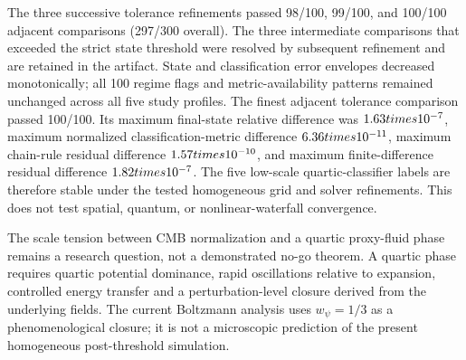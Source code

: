 \documentclass[epj]{svjour}
\begin{document}
The three successive tolerance refinements passed 98/100, 99/100,
and 100/100 adjacent comparisons (297/300 overall). The three
intermediate comparisons that exceeded the strict state threshold
were resolved by subsequent refinement and are retained in the
artifact. State and classification error envelopes decreased
monotonically; all 100 regime flags and metric-availability patterns
remained unchanged across all five study profiles. The finest
adjacent tolerance comparison passed 100/100. Its maximum final-state
relative difference was $1.63\\times10^{-7}$, maximum normalized
classification-metric difference $6.36\\times10^{-11}$, maximum
chain-rule residual difference $1.57\\times10^{-10}$, and maximum
finite-difference residual difference $1.82\\times10^{-7}$.
The five low-scale quartic-classifier labels are therefore stable
under the tested homogeneous grid and solver refinements. This does
not test spatial, quantum, or nonlinear-waterfall convergence.

The scale tension between CMB normalization and a quartic proxy-fluid
phase remains a research question, not a demonstrated no-go theorem.
A quartic phase requires quartic potential dominance, rapid
oscillations relative to expansion, controlled energy transfer and
a perturbation-level closure derived from the underlying fields.
The current Boltzmann analysis uses $w_\psi=1/3$ as a phenomenological
closure; it is not a microscopic prediction of the present
homogeneous post-threshold simulation.
\end{document}
